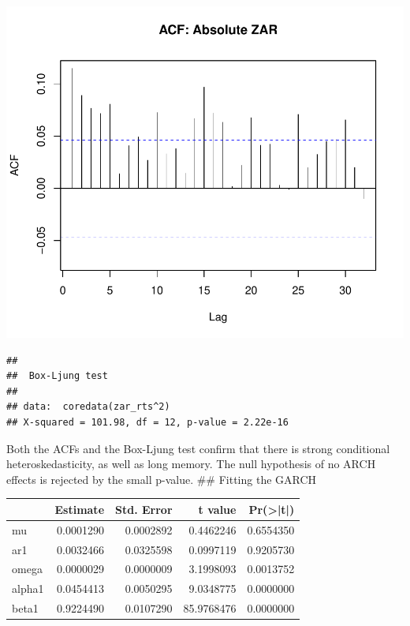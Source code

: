 \documentclass[12pt,preprint, authoryear]{elsarticle}
\numberwithin{equation}{section}
\numberwithin{figure}{section}
\numberwithin{table}{section}
\begin{document}
\includegraphics{Question-5_files/figure-latex/unnamed-chunk-6-1.pdf}

\begin{verbatim}
## 
##  Box-Ljung test
## 
## data:  coredata(zar_rts^2)
## X-squared = 101.98, df = 12, p-value = 2.22e-16
\end{verbatim}

Both the ACFs and the Box-Ljung test confirm that there is strong
conditional heteroskedasticity, as well as long memory. The null
hypothesis of no ARCH effects is rejected by the small p-value. \#\#
Fitting the GARCH

\begin{tabular}{l|r|r|r|r}
\hline
  &  Estimate &  Std. Error &  t value & Pr(>|t|)\\
\hline
mu & 0.0001290 & 0.0002892 & 0.4462246 & 0.6554350\\
\hline
ar1 & 0.0032466 & 0.0325598 & 0.0997119 & 0.9205730\\
\hline
omega & 0.0000029 & 0.0000009 & 3.1998093 & 0.0013752\\
\hline
alpha1 & 0.0454413 & 0.0050295 & 9.0348775 & 0.0000000\\
\hline
beta1 & 0.9224490 & 0.0107290 & 85.9768476 & 0.0000000\\
\hline
\end{tabular}
\end{document}
